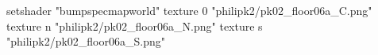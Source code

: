 setshader "bumpspecmapworld"
    texture 0 "philipk2/pk02_floor06a_C.png"
    texture n "philipk2/pk02_floor06a_N.png"
    texture s "philipk2/pk02_floor06a_S.png"